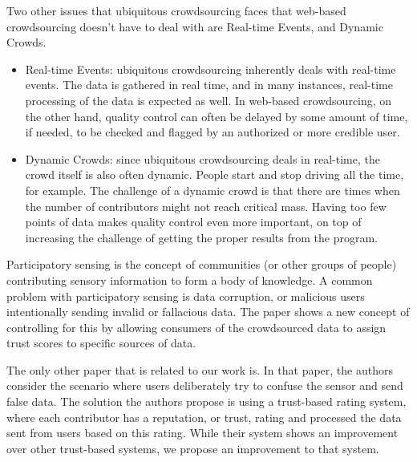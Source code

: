 \documentclass{sig-alternate-05-2015}
\begin{document}
	Two other issues that ubiquitous crowdsourcing faces that web-based crowdsourcing doesn't have to deal with are Real-time Events, and Dynamic Crowds.
	\begin{itemize}
		\item Real-time Events: ubiquitous crowdsourcing inherently deals with real-time events. The data is gathered in real time, and in many instances, real-time processing of the data is expected as well. %
		In web-based crowdsourcing, on the other hand, quality control can often be delayed by some amount of time, if needed, to be checked and flagged by an authorized or more credible user. 
		
		\item Dynamic Crowds: since ubiquitous crowdsourcing deals in real-time, the crowd itself is also often dynamic. People start and stop driving all the time, for example. The challenge of a dynamic crowd is that there are times when the number of contributors might not reach critical mass. Having too few points of data makes quality control even more important, on top of increasing the challenge of getting the proper results from the program.
	\end{itemize}
	
	Participatory sensing is the concept of communities (or other groups of people) contributing sensory information to form a body of knowledge. \cite{wilsondefinition}
	A common problem with participatory sensing is data corruption, or malicious users intentionally sending invalid or fallacious data. The paper \cite{reddy2009mobisense} shows a new concept of controlling for this by allowing consumers of the crowdsourced data to assign trust scores to specific sources of data. 
	
	The only other paper that is related to our work is. \cite{huang2010you}
	In that paper, the authors consider the scenario where users deliberately try to confuse the sensor and send false data. The solution the authors propose is using a trust-based rating system, where each contributor has a reputation, or trust, rating and processed the data sent from users based on this rating. While their system shows an improvement over other trust-based systems, we propose an improvement to that system.
	
	
\end{document}
